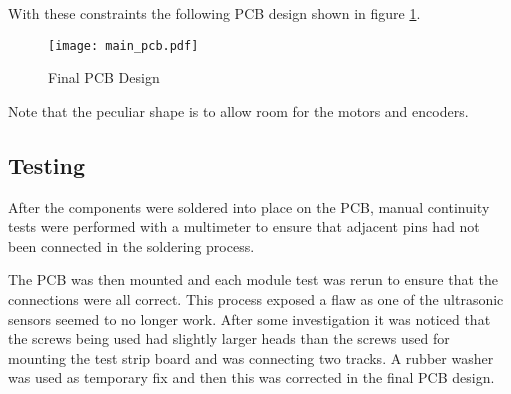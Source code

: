 With these constraints the following PCB design shown in figure \ref{PCB_Design}.

\begin{figure}[!ht]
	\centering
	\texttt{[image: main\_pcb.pdf]}
	\caption{Final PCB Design}\label{PCB_Design}

\end{figure}
Note that the peculiar shape is to allow room for the motors and encoders.

\subsection{Testing}\label{elec/pcb/test}
After the components were soldered into place on the PCB, manual
continuity tests were performed with a multimeter to ensure that adjacent
pins had not been connected in the soldering process.

The PCB was then mounted and each module test was rerun to ensure that the
connections were all correct. This process exposed a flaw as one of the
ultrasonic sensors seemed to no longer work. After some investigation it
was noticed that the screws being used had slightly larger heads than the
screws used for mounting the test strip board and was connecting two
tracks. A rubber washer was used as temporary fix and then this was
corrected in the final PCB design.
